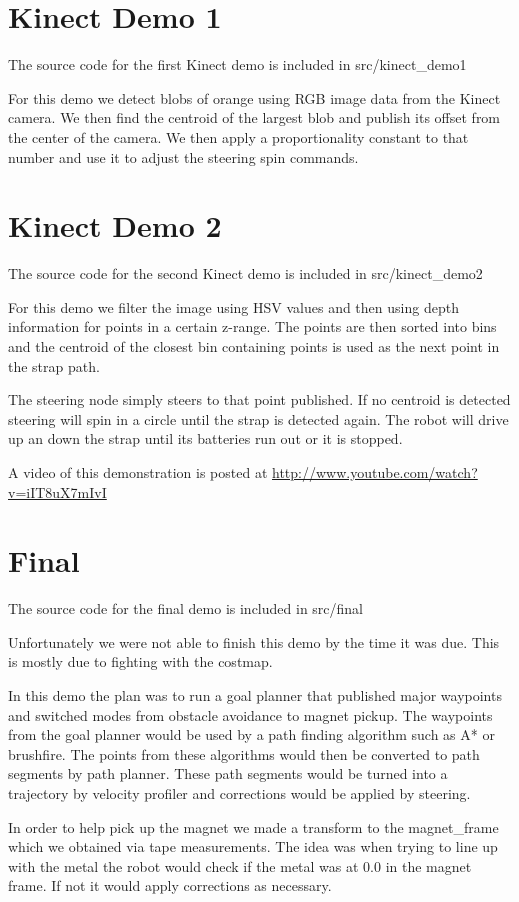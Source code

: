 \section{Kinect Demo 1}
The source code for the first Kinect demo is included in src/kinect\_demo1

For this demo we detect blobs of orange using RGB image data from the Kinect camera. We then find the centroid of the largest blob and publish its offset from the center of the camera. We then apply a proportionality constant to that number and use it to adjust the steering spin commands.

\section{Kinect  Demo 2}
The source code for the second Kinect demo is included in src/kinect\_demo2

For this demo we filter the image using HSV values and then using depth information for points in a certain z-range.  The points are then sorted into bins and the centroid of the closest bin containing points is used as the next point in the strap path.

The steering node simply steers to that point published. If no centroid is detected steering will spin in a circle until the strap is detected again. The robot will drive up an down the strap until its batteries run out or it is stopped.

A video of this demonstration is posted at \url{http://www.youtube.com/watch?v=iIT8uX7mIvI}

\section{Final}
The source code for the final demo is included in src/final

Unfortunately we were not able to finish this demo by the time it was due. This is mostly due to fighting with the costmap.

In this demo the plan was to run a goal planner that published major waypoints and switched modes from obstacle avoidance to magnet pickup.  The waypoints from the goal planner would be used by a path finding algorithm such as A* or brushfire. The points from these algorithms would then be converted to path segments by path planner. These path segments would be turned into a trajectory by velocity profiler and corrections would be applied by steering.

In order to help pick up the magnet we made a transform to the magnet_frame which we obtained via tape measurements. The idea was when trying to line up with the metal the robot would check if the metal was at 0.0 in the magnet frame. If not it would apply corrections as necessary.

